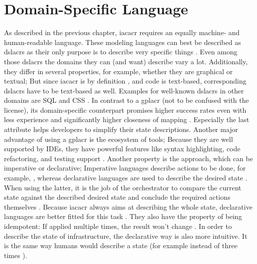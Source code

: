 

\section{Domain-Specific Language} %
As described in the previous chapter, \gls{iacacr} requires an equally machine- and human-readable language. These modeling languages can best be described as \gls{dslacr}s as their only purpose is to describe very specific things \cite{dsl_web_app}. Even among those \gls{dslacr}s the domains they can (and want) describe vary a lot. Additionally, they differ in several properties, for example, whether they are graphical or textual; But since \gls{iacacr} is by definition , and code is text-based, corresponding \gls{dslacr}s have to be text-based as well. Examples for well-known \gls{dslacr}s in other domains are SQL and CSS \cite{dsl_slides}.
\newline
In contrast to a \gls{gplacr} (not to be confused with the license), its domain-specific counterpart promises higher success rates even with less experience and significantly higher closeness of mapping \cite{comparing_gpl_dsl}. Especially the last attribute helps developers to simplify their state descriptions. Another major advantage of using a \gls{gplacr} is the ecosystem of tools; Because they are well supported by IDEs, they have powerful features like syntax highlighting, code refactoring, and testing support \cite{iac_oreilly}.
\newline
Another property is the approach, which can be imperative or declarative; Imperative languages describe actions to be done, for example, , whereas declarative languages are used to describe the desired state . When using the latter, it is the job of the orchestrator to compare the current state against the described desired state and conclude the required actions themselves \cite{dsl_for_iac}.
Because \gls{iacacr} always aims at describing the whole state, declarative languages are better fitted for this task \cite{iac_oreilly}. They also have the property of being idempotent: If applied multiple times, the result won't change \cite{iac_oreilly}. In order to describe the state of infrastructure, the declarative way is also more intuitive. It is the same way humans would describe a state (for example  instead of three times ).
